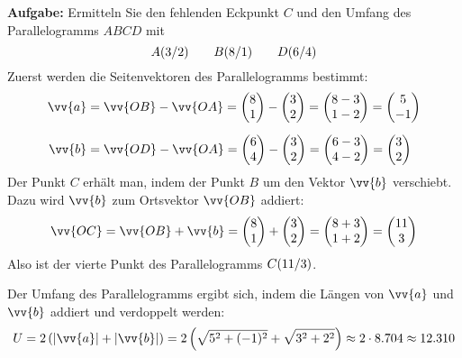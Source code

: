 \textbf{Aufgabe:} Ermitteln Sie den fehlenden Eckpunkt $C$ und den Umfang des Parallelogramms $ABCD$ mit
\[
  \pxy[A]{3,2} \qquad \pxy[B]{8,1} \qquad \pxy[D]{6,4}
\]
Zuerst werden die Seitenvektoren des Parallelogramms bestimmt:
\begin{align*}
  \vv{a} &= \vv{OB}-\vv{OA} = \vxy{8,1}-\vxy{3,2} = \vxy{8-3,1-2} = \vxy{5,-1} \\[2mm]
  \vv{b} &= \vv{OD}-\vv{OA} = \vxy{6,4}-\vxy{3,2} = \vxy{6-3,4-2} = \vxy{3,2}
\end{align*}
Der Punkt $C$ erhält man, indem der Punkt $B$ um den Vektor $\vv{b}$ verschiebt. Dazu wird $\vv{b}$ zum Ortsvektor $\vv{OB}$ addiert:
\[
  \vv{OC} = \vv{OB} + \vv{b} = \vxy{8,1} + \vxy{3,2} = \vxy{8+3,1+2} = \vxy{11,3}
\]
Also ist der vierte Punkt des Parallelogramms $\pxy[C]{11,3}$.
\begin{center}
\end{center}
Der Umfang des Parallelogramms ergibt sich, indem die Längen von $\vv{a}$ und $\vv{b}$ addiert und verdoppelt werden:
\[
  U = 2\left(|\vv{a}| + |\vv{b}|\right) = 2\left(\sqrt{5^{2}+(-1)^2}+\sqrt{3^{2}+2^{2}}\right) \approx 2\cdot 8.704 \approx 12.310
\]

\newpage
